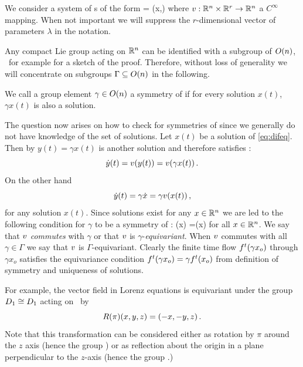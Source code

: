 \renewcommand{\inputfile}{\version\ - edited 2008-08-29 symODEs}





We consider a system of \ode s of the form
\beq
	 = \vf(x,\lambda)
	\label{eq:difeq}
\eeq
where $v: \mathbb{R}^{n}\times\mathbb{R}^{r} \rightarrow \mathbb{R}^{n}$ a $C^\infty$ mapping. When
not important we will suppress the $r$-dimensional vector of parameters
$\lambda$ in the notation.

Any compact Lie group acting on $\mathbb{R}^{n}$ can be identified
with a subgroup of $O(n)$, \cf\ for example 
for a sketch of the proof. Therefore, without loss of generality
we will concentrate on subgroups $\Gamma\subseteq O(n)$ in the following.

\begin{definition}
\label{def:symmetry}
We call a group element $\gamma\in O(n)$ a symmetry of  if for every solution
$x(t)$, $\gamma x(t)$ is also a solution.
\end{definition}

The question now arises on how to check for symmetries of  since
we generally do not have knowledge of the set of solutions. Let $x(t)$ be a solution
of \ref{eq:difeq}. Then by  $y(t)=\gamma x(t)$ is another solution
and therefore satisfies :
\[
 \dot{y}(t)=v{(y(t))}=v(\gamma x(t))\,.
\]
On the other hand
\[
 \dot{y}(t)=\gamma \dot{x} = \gamma v(x(t))\,,
\]
for any solution $x(t)$. Since solutions exist for any $x\in\mathbb{R}^{n}$ we are led to the following
condition for $\gamma$ to be a symmetry of :
\beq
	\vf(\gamma x) =\gamma \vf(x)
	\label{eq:equiv}
\eeq
for all $x\in\mathbb{R}^{n}$. We say that $v$ \emph{commutes} with $\gamma$ or that $v$ is $\gamma$-\emph{equivariant}.
When $v$ commutes with all $\gamma\in\Gamma$ we say that $v$ is $\Gamma$-equivariant.
Clearly the finite time flow ${f^{t}(\gamma x_o)}$ through $\gamma x_o$
satisfies the equivariance condition ${f^{t}(\gamma x_o)}=\gamma {f^{t}(x_o)}$ from
definition of symmetry and uniqueness of solutions.


For example, the vector field in Lorenz equations   is equivariant under the group
$D_1\cong D_{1}$ acting on \ by
\[
	R(\pi)(x,y,z) = (-x,-y,z)\,.
\]
Note that this transformation can be considered either as rotation by $\pi$ around the $z$ axis (hence the
group \Ztwo) or as reflection about the origin in a plane perpendicular to the $z$-axis (hence the group .)

